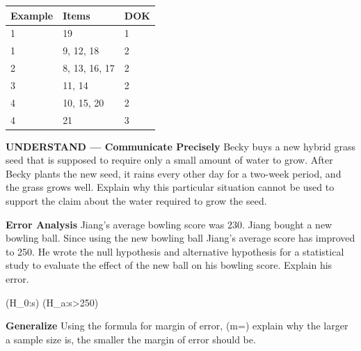 \documentclass{article}
\newenvironment{item-analysis}{}{}      %
\newenvironment{practice}[2]{}{}        %
\newcommand{\answer}[1]{}               %
\newcommand{\te}[1]{}                   %
\begin{document}
\begin{item-analysis}
\begin{tabular}{lll}
\toprule
Example & Items & DOK \\
\midrule
1 & 19 & 1 \\
1 & 9, 12, 18 & 2 \\
2 & 8, 13, 16, 17 & 2 \\
3 & 11, 14 & 2 \\
4 & 10, 15, 20 & 2 \\
4 & 21 & 3 \\
\bottomrule
\end{tabular}
\end{item-analysis}
\begin{practice}{8}{2}
\textbf{UNDERSTAND — Communicate Precisely} Becky buys a new hybrid grass seed that is supposed to require only a small amount of water to grow. After Becky plants the new seed, it rains every other day for a two-week period, and the grass grows well. Explain why this particular situation cannot be used to support the claim about the water required to grow the seed.
\answer{Due to the regular rainfall following the grass planting, Becky would be unable to determine whether or not the claims made by the vendor were true.}
\end{practice}
\begin{practice}{9}{2}
\textbf{Error Analysis} Jiang's average bowling score was 230. Jiang bought a new bowling ball. Since using the new bowling ball Jiang's average score has improved to 250. He wrote the null hypothesis and alternative hypothesis for a statistical study to evaluate the effect of the new ball on his bowling score. Explain his error.
\te{Student work with red X:}
(H_0:s)
(H_a:s>250)
\answer{The number 230 should have been used instead of 250 in both the null and alternative hypotheses.}
\end{practice}
\begin{practice}{10}{2}
\textbf{Generalize} Using the formula for margin of error, (m=) explain why the larger a sample size is, the smaller the margin of error should be.
\answer{Since the variable (n) represents the sample size, the larger the value of (n), the larger the denominator will be. Since the denominator represents the divisor, the larger the divisor, the smaller the quotient will be, which in this case is the margin of error.}
\end{practice}
\end{document}
